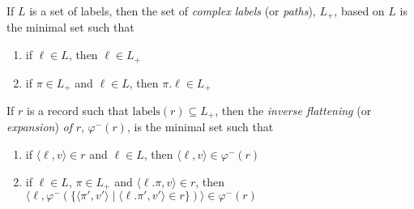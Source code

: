 If $L$ is a set of labels,
then the set of \textit{complex labels} (or \textit{paths}), $L_+$,
based on $L$ is the minimal set such that
\begin{enumerate} 
 
\item if $\ell\in L$, then $\ell\in L_+$ 
 
\item if $\pi\in L_+$ and $\ell\in L$, then $\pi.\ell\in L_+$ 
 
\end{enumerate}

If $r$ is a record such that $\mathrm{labels}(r)\subseteq L_+$, then
the \textit{inverse flattening} (or \textit{expansion}) \textit{of}
$r$, $\varphi^-(r)$, is the minimal set such that
\begin{enumerate} 
 
\item if $\langle\ell,v\rangle\in r$ and $\ell\in L$, then $\langle\ell,v\rangle\in\varphi^-(r)$ 
 
\item if $\ell\in L$, $\pi\in L_+$ and $\langle\ell.\pi,v\rangle\in
  r$, then 
$\langle\ell,\varphi^-(\{\langle\pi',v'\rangle\mid\langle\ell.\pi',v'\rangle\in r\})\rangle\in\varphi^-(r)$
 
\end{enumerate} 
  

